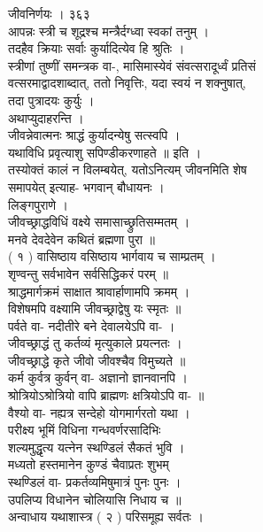 \documentclass[11pt, openany]{book}
\begin{document}
{{{{{{{{{{{{{{{{{{{{{{{{{{{{{{{{{{{{{{{{{{{{{{{{{{{{{{{{{{{{{{{{{{{{{{{{{{{{{{{{{{{{{{{{{{{ जीवनिर्णयः । ३६३\\
आपन्नः स्त्री च शूद्रश्च मन्त्रैर्दग्ध्वा स्वकां तनुम् ।\\
तदहैव क्रियाः सर्वाः कुर्यादित्येव हि श्रुतिः ।\\
स्त्रीणां तुष्णीं समन्त्रक वा-, मासिमास्येवं संवत्सरादूर्ध्वं प्रतिसं\\
वत्सरमाद्वादशाब्दात्, ततो निवृत्तिः, यदा स्वयं }{न}{ शक्नुषात्,\\
तदा पुत्रादयः कुर्युः ।\\
अथाप्युदाहरन्ति ।\\
जीवन्नेवात्मनः श्राद्धं कुर्यादन्येषु सत्स्वपि ।\\
यथाविधि प्रवृत्याशु सपिण्डीकरणाहते ॥ }{इति}{ ।\\
तस्योक्तं कालं }{न}{ विलम्बयेत्, यतोऽनित्यम् जीवनमिति शेष\\
समापयेत् इत्याह- भगवान् बौधायनः ।\\
}{लिङ्गपुराणे ।}{\\
जीवच्छ्राद्धविधिं वक्ष्ये समासाच्छ्रुतिसम्मतम् ।\\
मनवे देवदेवेन कथितं ब्रह्मणा पुरा ॥\\
( १ ) वासिष्ठाय वसिष्ठाय भार्गवाय च साम्प्रतम् ।\\
शृण्वन्तु सर्वभावेन सर्वसिद्धिकरं परम् ॥\\
श्राद्धमार्गक्रमं साक्षात श्रावार्हाणामपि क्रमम् ।\\
विशेषमपि वक्ष्यामि जीवच्छ्राद्वेषु यः स्मृतः ॥\\
पर्वते वा- नदीतीरे बने देवालयेऽपि वा- ।\\
जीवच्छ्राद्धं तु कर्तव्यं मृत्युकाले प्रयत्नतः ।\\
जीवच्छ्राद्धे कृते जीवो जीवश्चैव विमुच्यते ॥\\
कर्म कुर्वत्र कुर्वन् वा- अज्ञानो ज्ञानवानपि ।\\
श्रोत्रियोऽश्रोत्रियो वापि ब्राह्मणः क्षत्रियोऽपि वा- ॥\\
वैश्यो वा- नह्यत्र सन्देहो योगमार्गरतो यथा ।\\
परीक्ष्य भूमिं विधिना गन्धवर्णरसादिभिः \textbar{}\textbar{}\\
शल्यमुद्धृत्य यत्नेन स्थण्डिलं सैकतं भुवि ।\\
मध्यतो हस्तमानेन कुण्डं चैवाप्रतः शुभम् \textbar{}\textbar{}\\
स्थण्डिलं वा- प्रकर्तव्यमिषुमात्रं पुनः पुनः ।\\
उपलिप्य विधानेन चोलियासि निधाय च ॥\\
अन्वाधाय यथाशास्त्र ( २ ) परिसमूह्य सर्वतः ।\\


}}}}}}}}}}}}}}}}}}}}}}}}}}}}}}}}}}}}}}}}}}}}}}}}}}}}}}}}}}}}}}}}}}}}}}}}}}}}}}}}}}}}}}}}}}}
\end{document}
